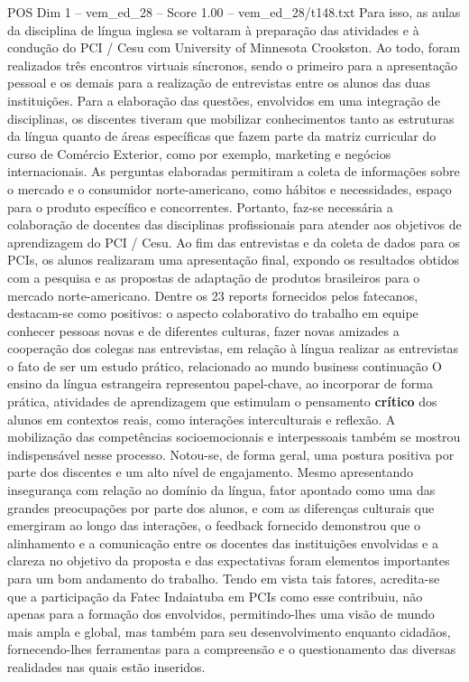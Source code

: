 \begin{textsample}{POS Dim 1 – vem\_ed\_28 – Score 1.00 – vem\_ed\_28/t148.txt}
Para isso, as aulas da disciplina de língua inglesa se voltaram à preparação das atividades e à condução do PCI / Cesu com University of Minnesota Crookston.
Ao todo, foram realizados três encontros virtuais síncronos, sendo o primeiro para a apresentação pessoal e os demais para a realização de entrevistas entre os alunos das duas instituições.
Para a elaboração das questões, envolvidos em uma integração de disciplinas, os discentes tiveram que mobilizar conhecimentos tanto as estruturas da língua quanto de áreas específicas que fazem parte da matriz curricular do curso de Comércio Exterior, como por exemplo, marketing e negócios internacionais.
As perguntas elaboradas permitiram a coleta de informações sobre o mercado e o consumidor norte-americano, como hábitos e necessidades, espaço para o produto específico e concorrentes.
Portanto, faz-se necessária a colaboração de docentes das disciplinas profissionais para atender aos objetivos de aprendizagem do PCI / Cesu.
Ao fim das entrevistas e da coleta de dados para os PCIs, os alunos realizaram uma apresentação final, expondo os resultados obtidos com a pesquisa e as propostas de adaptação de produtos brasileiros para o mercado norte-americano.
Dentre os 23 reports fornecidos pelos fatecanos, destacam-se como positivos: o aspecto colaborativo do trabalho em equipe conhecer pessoas novas e de diferentes culturas, fazer novas amizades a cooperação dos colegas nas entrevistas, em relação à língua realizar as entrevistas o fato de ser um estudo prático, relacionado ao mundo business continuação O ensino da língua estrangeira representou papel-chave, ao incorporar de forma prática, atividades de aprendizagem que estimulam o pensamento \textbf{crítico} dos alunos em contextos reais, como interações interculturais e reflexão.
A mobilização das competências socioemocionais e interpessoais também se mostrou indispensável nesse processo.
Notou-se, de forma geral, uma postura positiva por parte dos discentes e um alto nível de engajamento.
Mesmo apresentando insegurança com relação ao domínio da língua, fator apontado como uma das grandes preocupações por parte dos alunos, e com as diferenças culturais que emergiram ao longo das interações, o feedback fornecido demonstrou que o alinhamento e a comunicação entre os docentes das instituições envolvidas e a clareza no objetivo da proposta e das expectativas foram elementos importantes para um bom andamento do trabalho.
Tendo em vista tais fatores, acredita-se que a participação da Fatec Indaiatuba em PCIs como esse contribuiu, não apenas para a formação dos envolvidos, permitindo-lhes uma visão de mundo mais ampla e global, mas também para seu desenvolvimento enquanto cidadãos, fornecendo-lhes ferramentas para a compreensão e o questionamento das diversas realidades nas quais estão inseridos.

\end{textsample}

